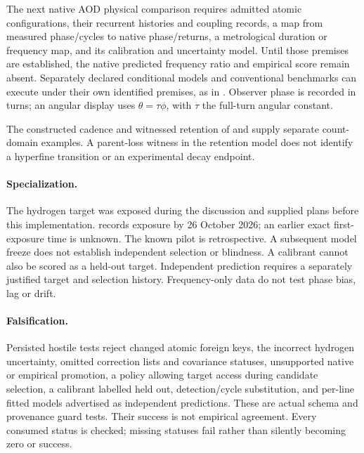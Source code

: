 The next native AOD physical comparison requires admitted atomic configurations, their recurrent histories and coupling records, a map from measured phase/cycles to native phase/returns, a metrological duration or frequency map, and its calibration and uncertainty model. Until those premises are established, the native predicted frequency ratio and empirical score remain absent. Separately declared conditional models and conventional benchmarks can execute under their own identified premises, as in . Observer phase is recorded in turns; an angular display uses \(\theta=\tau\phi\), with \(\tau\) the full-turn angular constant.

The constructed cadence and witnessed retention of
 and 
supply separate count-domain examples. A parent-loss witness in the retention model
does not identify a hyperfine transition or an experimental decay endpoint.

\paragraph{Specialization.}
The hydrogen target was exposed during the discussion and supplied plans before this implementation.  records exposure by 26 October 2026; an earlier exact first-exposure time is unknown. The known pilot is retrospective. A subsequent model freeze does not establish independent selection or blindness. A calibrant cannot also be scored as a held-out target. Independent prediction requires a separately justified target and selection history. Frequency-only data do not test phase bias, lag or drift.

\paragraph{Falsification.}
Persisted hostile tests reject changed atomic foreign keys, the incorrect hydrogen uncertainty, omitted correction lists and covariance statuses, unsupported native or empirical promotion, a policy allowing target access during candidate selection, a calibrant labelled held out, detection/cycle substitution, and per-line fitted models advertised as independent predictions. These are actual schema and provenance guard tests. Their success is not empirical agreement. Every consumed status is checked; missing statuses fail rather than silently becoming zero or success.

